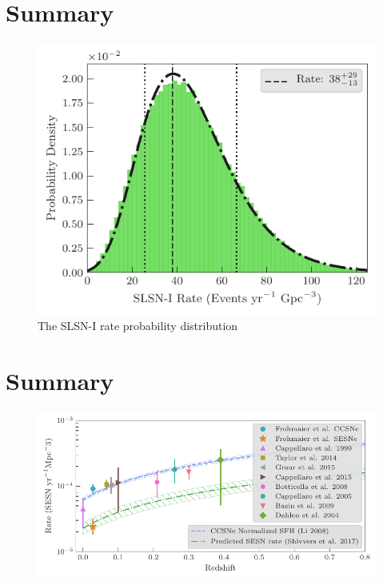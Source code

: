 \documentclass[a4paper,fleqn,usenatbib]{mnras}
\begin{document}
\section{Summary}


\begin{figure}
	\includegraphics[width=\linewidth]{./SLSN_Rate_Dist.pdf}
    \caption{The SLSN-I rate probability distribution}
    \label{fig:SLSNrateProbDist}
\end{figure}



\section{Summary}



\begin{figure}
	\includegraphics[width=\linewidth]{./allCC_Compare_Literature.pdf}
    \caption{}
    \label{fig:rates_CC_lit}
\end{figure}
\end{document}

